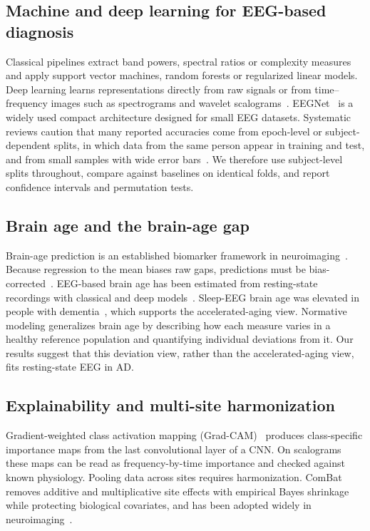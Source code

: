 \documentclass[journal]{IEEEtran}
\begin{document}
\subsection{Machine and deep learning for EEG-based diagnosis}
Classical pipelines extract band powers, spectral ratios or complexity measures and apply support vector machines, random forests or regularized linear models. Deep learning learns representations directly from raw signals or from time--frequency images such as spectrograms and wavelet scalograms~\cite{craik2019,roy2019}. EEGNet~\cite{eegnet} is a widely used compact architecture designed for small EEG datasets. Systematic reviews caution that many reported accuracies come from epoch-level or subject-dependent splits, in which data from the same person appear in training and test, and from small samples with wide error bars~\cite{roy2019,varoquaux2018}. We therefore use subject-level splits throughout, compare against baselines on identical folds, and report confidence intervals and permutation tests.

\subsection{Brain age and the brain-age gap}
Brain-age prediction is an established biomarker framework in neuroimaging~\cite{cole2017,franke2019}. Because regression to the mean biases raw gaps, predictions must be bias-corrected~\cite{delange2020}. EEG-based brain age has been estimated from resting-state recordings with classical and deep models~\cite{alzoubi2018,engemann2022}. Sleep-EEG brain age was elevated in people with dementia~\cite{sun2019}, which supports the accelerated-aging view. Normative modeling generalizes brain age by describing how each measure varies in a healthy reference population and quantifying individual deviations from it. Our results suggest that this deviation view, rather than the accelerated-aging view, fits resting-state EEG in AD.

\subsection{Explainability and multi-site harmonization}
Gradient-weighted class activation mapping (Grad-CAM)~\cite{gradcam} produces class-specific importance maps from the last convolutional layer of a CNN. On scalograms these maps can be read as frequency-by-time importance and checked against known physiology. Pooling data across sites requires harmonization. ComBat~\cite{johnson2007} removes additive and multiplicative site effects with empirical Bayes shrinkage while protecting biological covariates, and has been adopted widely in neuroimaging~\cite{fortin2018}.
\end{document}

